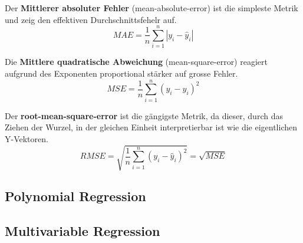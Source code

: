 \begin{flushleft}
Der \textbf{Mittlerer absoluter Fehler} (mean-absolute-error) ist die simpleste Metrik und zeig den effektiven Durchschnittsfehelr auf. 
$$MAE = \dfrac{1}{n}\sum_{i=1}^n|y_{i} - \hat{y}_{i}|$$


Die \textbf{Mittlere quadratische Abweichung} (mean-square-error) reagiert aufgrund des Exponenten proportional stärker auf grosse Fehler.
$$MSE = \dfrac{1}{n}\sum_{i=1}^n(y_{i} - \hat{y}_{i})^{2}$$

Der \textbf{root-mean-square-error} ist die gängigste Metrik, da dieser, durch das Ziehen der Wurzel, in der gleichen Einheit interpretierbar ist wie die eigentlichen Y-Vektoren.
$$RMSE = \sqrt{\dfrac{1}{n}\sum_{i=1}^n(y_{i} - \hat{y}_{i})^{2}} = \sqrt{MSE}$$


\subsection{Polynomial Regression}
\subsection{Multivariable Regression}

\end{flushleft}